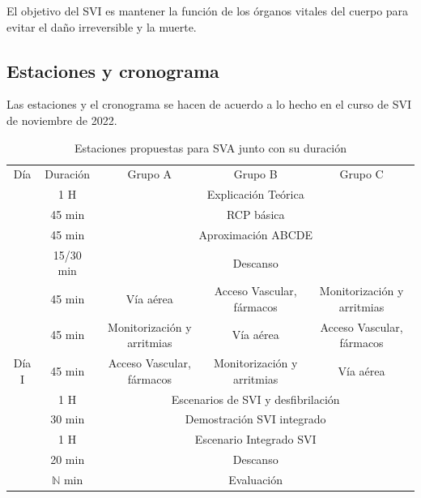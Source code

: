 El objetivo del SVI es mantener la función de los órganos vitales del cuerpo para evitar el daño irreversible y la muerte.

\subsection{Estaciones y cronograma}
Las estaciones y el cronograma se hacen de acuerdo a lo hecho en el curso de SVI de noviembre de 2022. 

\begin{table}[hptb]
    \centering
    \begin{tabular}{ccccc}
    \rowcolor[HTML]{333333} 
    {\color[HTML]{FFFFFF} Día} & {\color[HTML]{FFFFFF} Duración} & {\color[HTML]{FFFFFF} Grupo A} & {\color[HTML]{FFFFFF} Grupo B} & {\color[HTML]{FFFFFF} Grupo C} \\
     & 1 H & \multicolumn{3}{c}{Explicación Teórica} \\
     & \cellcolor[HTML]{D9D9D9}45 min & \multicolumn{3}{c}{\cellcolor[HTML]{D9D9D9}RCP básica} \\
     & 45 min & \multicolumn{3}{c}{Aproximación ABCDE} \\
     & \cellcolor[HTML]{D9D9D9}15/30 min & \multicolumn{3}{c}{\cellcolor[HTML]{D9D9D9}Descanso} \\
     & 45 min & Vía aérea & Acceso Vascular, fármacos & Monitorización y arritmias \\
     & \cellcolor[HTML]{D9D9D9}45 min & \cellcolor[HTML]{D9D9D9}Monitorización y arritmias & \cellcolor[HTML]{D9D9D9}Vía aérea & \cellcolor[HTML]{D9D9D9}Acceso Vascular,  fármacos \\
    \multirow{-7}{*}{Día I} & 45 min & Acceso Vascular, fármacos & Monitorización y arritmias & Vía aérea \\ \hline
    \rowcolor[HTML]{D9D9D9} 
    \cellcolor[HTML]{D9D9D9} & 1 H & \multicolumn{3}{c}{\cellcolor[HTML]{D9D9D9}Escenarios de SVI y desfibrilación} \\
    \cellcolor[HTML]{D9D9D9} & 30 min & \multicolumn{3}{c}{Demostración SVI integrado} \\
    \rowcolor[HTML]{D9D9D9} 
    \cellcolor[HTML]{D9D9D9} & 1 H & \multicolumn{3}{c}{\cellcolor[HTML]{D9D9D9}Escenario Integrado SVI} \\
    \cellcolor[HTML]{D9D9D9} & 20 min & \multicolumn{3}{c}{Descanso} \\
    \rowcolor[HTML]{D9D9D9} 
    \multirow{-5}{*}{\cellcolor[HTML]{D9D9D9}Día II} & $\mathbb{N}$ min & \multicolumn{3}{c}{\cellcolor[HTML]{D9D9D9}Evaluación} \\ \hline
    \end{tabular}
    \caption{Estaciones propuestas para SVA junto con su duración}
    \label{tab:Brusilov:SVI:Estaciones}
\end{table}

